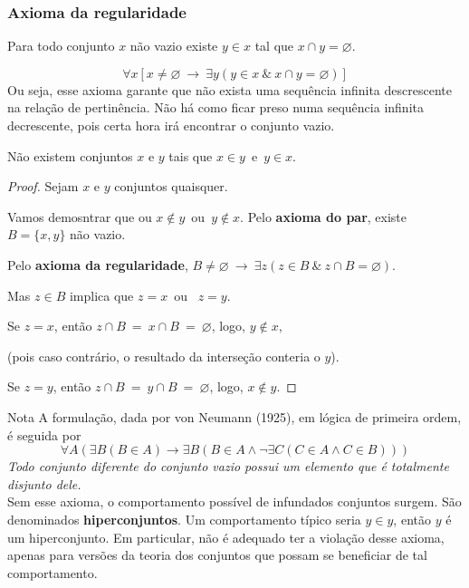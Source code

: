       \subsubsection{Axioma da regularidade}
         \begin{stat}
            Para todo conjunto $x$ não vazio existe $y \in x$ tal que $x \cap y = \varnothing$.
         \end{stat}
         $$ \forall x [x \neq \varnothing\ \rightarrow\ \exists y (y \in x\ \&\ x \cap y = \varnothing)]$$
         Ou seja, esse axioma garante que não exista uma sequência infinita descrescente na relação de pertinência. Não há como ficar preso numa sequência infinita decrescente, pois certa hora irá encontrar o conjunto vazio.
         \begin{theorem}
            Não existem conjuntos $x$ e $y$ tais que $x \in y$\ e\ $y \in x$.
         \end{theorem}
         \begin{proof}
            Sejam $x$ e $y$ conjuntos quaisquer.    
            
            Vamos demosntrar que ou $x \notin y$\ ou\ $y \notin x$. Pelo \textbf{axioma do par}, existe $B = \{x,y\}$ não vazio.
            
            Pelo \textbf{axioma da regularidade}, $B \neq \varnothing\ \rightarrow\ \exists z (z \in B\ \&\ z \cap B = \varnothing).$
            
            Mas $z \in B$ implica que $z = x$\ ou \ $z = y$.
            
            Se $z=x$, então $z \cap B\ =\ x \cap B\ =\ \varnothing$, logo, $y \notin x$,

            (pois caso contrário, o resultado da interseção conteria o $y$).

            Se $z=y$, então $z \cap B\ =\ y \cap B\ =\ \varnothing$, logo, $x \notin y$.
         \end{proof}
         \begin{mymdframed}{Nota}
            A formulação, dada por von Neumann (1925), em lógica de primeira ordem, é seguida por
            $$\forall A(\exists B(B\in A)\rightarrow \exists B(B\in A\land \neg \exists C(C\in A\land C\in B)))$$
            \textit{Todo conjunto diferente do conjunto vazio possui um elemento que é totalmente disjunto dele.}\\
            Sem esse axioma, o comportamento possível de infundados conjuntos surgem. São denominados \textbf{hiperconjuntos}. Um comportamento típico seria $y \in y$, então $y$ é um hiperconjunto. Em particular, não é adequado ter a violação desse axioma, apenas para versões da teoria dos conjuntos que possam se beneficiar de tal comportamento.
         \end{mymdframed}